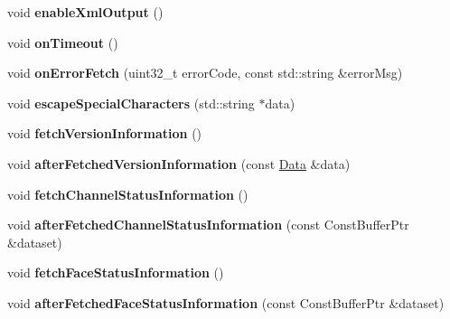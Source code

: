 \begin{DoxyCompactItemize}
\item 
void {\bfseries enable\+Xml\+Output} ()\hypertarget{classndn_1_1NfdStatus_a18873351cb8f9fa3ba444133270784c6}{}\label{classndn_1_1NfdStatus_a18873351cb8f9fa3ba444133270784c6}

\item 
void {\bfseries on\+Timeout} ()\hypertarget{classndn_1_1NfdStatus_a528fa504b6a68c741cece6f559ce5928}{}\label{classndn_1_1NfdStatus_a528fa504b6a68c741cece6f559ce5928}

\item 
void {\bfseries on\+Error\+Fetch} (uint32\+\_\+t error\+Code, const std\+::string \&error\+Msg)\hypertarget{classndn_1_1NfdStatus_a17e38f5ff33f62e1c564f526e3145487}{}\label{classndn_1_1NfdStatus_a17e38f5ff33f62e1c564f526e3145487}

\item 
void {\bfseries escape\+Special\+Characters} (std\+::string $\ast$data)\hypertarget{classndn_1_1NfdStatus_a22d3c43ed39ae2c2fc63a3f144ba97f5}{}\label{classndn_1_1NfdStatus_a22d3c43ed39ae2c2fc63a3f144ba97f5}

\item 
void {\bfseries fetch\+Version\+Information} ()\hypertarget{classndn_1_1NfdStatus_ab42a538da033ab5d836c35abee08f4f9}{}\label{classndn_1_1NfdStatus_ab42a538da033ab5d836c35abee08f4f9}

\item 
void {\bfseries after\+Fetched\+Version\+Information} (const \hyperlink{classndn_1_1Data}{Data} \&data)\hypertarget{classndn_1_1NfdStatus_a1e972d6137635b5d476c140f09657ca0}{}\label{classndn_1_1NfdStatus_a1e972d6137635b5d476c140f09657ca0}

\item 
void {\bfseries fetch\+Channel\+Status\+Information} ()\hypertarget{classndn_1_1NfdStatus_a2f6b136575767c290cbca5a3660de779}{}\label{classndn_1_1NfdStatus_a2f6b136575767c290cbca5a3660de779}

\item 
void {\bfseries after\+Fetched\+Channel\+Status\+Information} (const Const\+Buffer\+Ptr \&dataset)\hypertarget{classndn_1_1NfdStatus_ae567e900a14c2bc972f87b0ef1315c7c}{}\label{classndn_1_1NfdStatus_ae567e900a14c2bc972f87b0ef1315c7c}

\item 
void {\bfseries fetch\+Face\+Status\+Information} ()\hypertarget{classndn_1_1NfdStatus_adde11972f9bd006f4fed41f357d05f11}{}\label{classndn_1_1NfdStatus_adde11972f9bd006f4fed41f357d05f11}

\item 
void {\bfseries after\+Fetched\+Face\+Status\+Information} (const Const\+Buffer\+Ptr \&dataset)\hypertarget{classndn_1_1NfdStatus_a2c10c78506657c0093cc68baadd2e0d0}{}\label{classndn_1_1NfdStatus_a2c10c78506657c0093cc68baadd2e0d0}


\end{DoxyCompactItemize}
